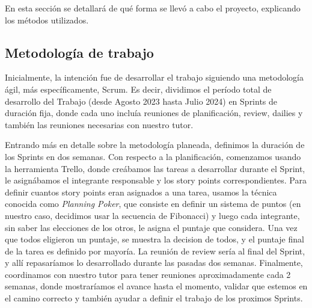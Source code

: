 
\noindent En esta sección se detallará de qué forma se llevó a cabo el proyecto, explicando los métodos
utilizados.

\subsection{Metodología de trabajo}

\noindent Inicialmente, la intención fue de desarrollar el trabajo siguiendo una metodología ágil, más específicamente, Scrum.
Es decir, dividimos el período total de desarrollo del Trabajo (desde Agosto 2023 hasta Julio 2024) en Sprints de duración fija,
donde cada uno incluía reuniones de planificación, review, dailies y también las reuniones necesarias con nuestro tutor.

\noindent Entrando más en detalle sobre la metodología planeada, definimos la duración de los Sprints en dos semanas. Con respecto a
la planificación, comenzamos usando la herramienta Trello, donde creábamos las tareas a desarrollar durante el Sprint, le asignábamos
el integrante responsable y los story points correspondientes. Para definir cuantos story points eran asignados a una tarea, usamos la
técnica conocida como \textit{Planning Poker}, que consiste en definir un sistema de puntos (en nuestro caso, decidimos usar la secuencia
de Fibonacci) y luego cada integrante, sin saber las elecciones de los otros, le asigna el puntaje que considera. Una vez que todos
eligieron un puntaje, se muestra la decision de todos, y el puntaje final de la tarea es definido por mayoría. La reunión de review sería
al final del Sprint, y allí repasaríamos lo desarrollado durante las pasadas dos semanas. Finalmente, coordinamos con nuestro tutor para tener reuniones aproximadamente cada 2 semanas, donde mostraríamos el avance hasta el momento,
validar que estemos en el camino correcto y también ayudar a definir el trabajo de los proximos Sprints.

